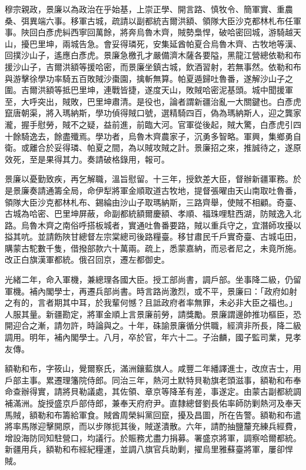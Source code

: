 \begin{pinyinscope}
穆宗親政，景廉以為政治在乎始基，上崇正學、開言路、慎牧令、簡軍實、重農桑、弭異端六事。移軍古城，疏請以副都統吉爾洪額、領隊大臣沙克都林札布任軍事。陜回白彥虎糾西寧回萬餘，將奔烏魯木齊，賊勢梟悍，破哈密回城，游騎越天山，擾巴里坤，兩城告急。會妥得璘死，安集延酋帕夏合烏魯木齊、古牧地等漢、回撲沙山子，遙應白彥虎。景廉急檄孔才嚴備濟木薩各要隘，黑龍江營總依勒和布援沙山子，吉爾洪額等援哈密，而景廉坐鎮古城，飲酒習射，若無事然。依勒和布與游擊徐學功率騎五百敗賊沙棗園，擒斬無算。帕夏遁歸吐魯番，遂解沙山子之圍。吉爾洪額等抵巴里坤，連戰皆捷，遂度天山，敗賊哈密泥基頭。城中聞援軍至，大呼突出，賊敗，巴里坤肅清。是役也，論者謂新疆治亂一大關鍵也。白彥虎竄唐朝渠，將入瑪納斯，學功偵得賊口號，選精騎四百，偽為瑪納斯人，迎之龔家瀧，握手慰勞，賊不之疑，益前進，前臨大河。官軍從後起，賊大驚，白彥虎引四十餘騎逸去，餘盡殲焉。學功者，烏魯木齊農家子，沉勇多智略。軍興，集鄉勇自衛。或離合於妥得璘、帕夏之間，為以賊攻賊之計。景廉招之來，推誠待之，遂原效死，至是果得其力。奏請破格錄用，報可。

景廉以憂勤致疾，再乞解職，溫旨慰留。十三年，授欽差大臣，督辦新疆軍務。於是景廉奏請通籌全局，命伊犁將軍金順取道古牧地，提督張曜由天山南取吐魯番，領隊大臣沙克都林札布、錫綸由沙山子取瑪納斯，三路齊舉，使賊不相顧。奇臺、古城為哈密、巴里坤屏蔽，命副都統額爾慶額、孝順、福珠哩駐西湖，防賊逸入北路。烏魯木齊之南俗呼搭板城者，實通吐魯番要路，賊以重兵守之，宜潛師攻擾以搤其吭。並請飭陜甘總督左宗棠總司後路糧臺。移甘肅民千戶實奇臺、古城屯田，購蒙古駝數千隻，借撥部款六十萬兩。疏上，悉蒙嘉納，而忌者尼之，未竟所施。改正白旗漢軍都統。俄召回京，遷左都御史。

光緒二年，命入軍機，兼總理各國大臣。授工部尚書，調戶部。坐事降二級，仍留軍機。補內閣學士，再遷兵部尚書。時言路尚激烈，或不平，景廉曰：「政府如射之有的，言者期其中耳，於我輩何憾？且詆政府者率無罪，未必非大臣之福也。」人服其量。新疆勘定，將軍金順上言景廉前勞，請獎勵。景廉謂邊帥推功樞臣，恐開迎合之漸，請勿許，時論與之。十年，硃諭景廉循分供職，經濟非所長，降二級調用。明年，補內閣學士。八月，卒於官，年六十二。子治麟，國子監司業，見孝友傳。

額勒和布，字筱山，覺爾察氏，滿洲鑲藍旗人。咸豐二年繙譯進士，改庶吉士，用戶部主事。累遷理籓院侍郎。同治三年，熱河土默特貝勒旗老頭滋事，額勒和布奉命查辦得實，請將貝勒議處，其佐領、章京等降革有差，事遂定。由蒙古副都統調補滿洲。旋授盛京戶部侍郎，兼奉天府府尹。直隸總督劉長佑率師防剿熱河及奉天馬賊，額勒和布籌給軍食。賊酋周榮糾黨回竄，擾及昌圖，所在告警。額勒和布遣將率馬隊迎擊開原，而以步隊扼其後，賊遂潰散。六年，請酌抽鹽釐充練兵經費，增設海防同知駐營口，均議行。於賑務尤盡力捐募。署盛京將軍，調察哈爾都統。新疆用兵，額勒和布經紀糧運，並調八旗官兵助剿，擢烏里雅蘇臺將軍，屢卻悍賊。


\end{pinyinscope}
